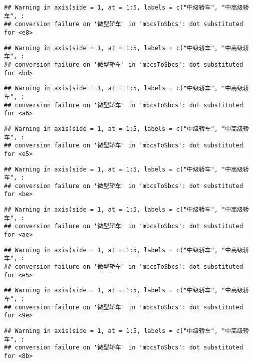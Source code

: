 \documentclass[]{article}
\begin{document}
\begin{verbatim}
## Warning in axis(side = 1, at = 1:5, labels = c("中级轿车", "中高级轿车", :
## conversion failure on '微型轿车' in 'mbcsToSbcs': dot substituted for <e8>
\end{verbatim}

\begin{verbatim}
## Warning in axis(side = 1, at = 1:5, labels = c("中级轿车", "中高级轿车", :
## conversion failure on '微型轿车' in 'mbcsToSbcs': dot substituted for <bd>
\end{verbatim}

\begin{verbatim}
## Warning in axis(side = 1, at = 1:5, labels = c("中级轿车", "中高级轿车", :
## conversion failure on '微型轿车' in 'mbcsToSbcs': dot substituted for <a6>
\end{verbatim}

\begin{verbatim}
## Warning in axis(side = 1, at = 1:5, labels = c("中级轿车", "中高级轿车", :
## conversion failure on '微型轿车' in 'mbcsToSbcs': dot substituted for <e5>
\end{verbatim}

\begin{verbatim}
## Warning in axis(side = 1, at = 1:5, labels = c("中级轿车", "中高级轿车", :
## conversion failure on '微型轿车' in 'mbcsToSbcs': dot substituted for <be>
\end{verbatim}

\begin{verbatim}
## Warning in axis(side = 1, at = 1:5, labels = c("中级轿车", "中高级轿车", :
## conversion failure on '微型轿车' in 'mbcsToSbcs': dot substituted for <ae>
\end{verbatim}

\begin{verbatim}
## Warning in axis(side = 1, at = 1:5, labels = c("中级轿车", "中高级轿车", :
## conversion failure on '微型轿车' in 'mbcsToSbcs': dot substituted for <e5>
\end{verbatim}

\begin{verbatim}
## Warning in axis(side = 1, at = 1:5, labels = c("中级轿车", "中高级轿车", :
## conversion failure on '微型轿车' in 'mbcsToSbcs': dot substituted for <9e>
\end{verbatim}

\begin{verbatim}
## Warning in axis(side = 1, at = 1:5, labels = c("中级轿车", "中高级轿车", :
## conversion failure on '微型轿车' in 'mbcsToSbcs': dot substituted for <8b>
\end{verbatim}
\end{document}
